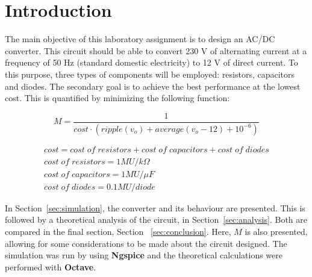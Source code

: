 \newpage

\section{Introduction}
\label{sec:introduction}


The main objective of this laboratory assignment is to design an AC/DC converter. This circuit should be able to convert 230 V of alternating current at a frequency of 50 Hz (standard domestic electricity) to 12 V of direct current. To this purpose, three types of components will be employed: resistors, capacitors and diodes. The secondary goal is to achieve the best performance at the lowest cost. This is quantified by minimizing the following function:

\begin{equation}
  M = \frac{1}{cost \cdot (ripple(v_o) + average(v_o-12) + 10^{-6})}
\end{equation}

\begin{gather*}
  cost = cost\;of\;resistors + cost\;of\;capacitors + cost\;of\;diodes \\
  cost\;of\;resistors = 1 MU/k\Omega \\
  cost\;of\;capacitors = 1 MU/\mu F \\
  cost\;of\;diodes = 0.1 MU/diode
\end{gather*}

In Section~\ref{sec:simulation}, the converter and its behaviour are presented. This is followed by a theoretical analysis of the circuit, in Section~\ref{sec:analysis}. Both are compared in the final section, Section ~\ref{sec:conclusion}. Here, $M$ is also presented, allowing for some considerations to be made about the circuit designed. The simulation was run by using {\bf Ngspice} and the theoretical calculations were performed with {\bf Octave}.

